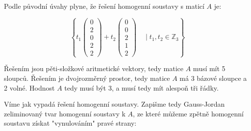 \documentclass[12pt]{article}
\begin{document}
\begin{enumerate}
    Podle původní úvahy plyne, že řešení homogenní soustavy s maticí $A$ je:

    \[
      \left\{
        t_1\left(\begin{array}{c}
          0\\2\\0\\2\\2
        \end{array}\right) +
        t_2 \left(\begin{array}{c}
          0\\0\\2\\1\\2
        \end{array}\right)
        \quad
        \mid
        t_1,t_2 \in \mathbb{Z}_3
      \right\}
    \]

    Řešením jsou pěti-složkové aritmetické vektory, tedy matice $A$ musí mít 5 sloupců.
    Řešením je dvojrozměrný prostor, tedy matice $A$ má 3 bázové sloupce a 2 volné.
    Hodnost $A$ tedy musí být 3, a musí tedy mít alespoň tři řádky.

    Víme jak vypadá řešení homogenní soustavy.
    Zapišme tedy Gauss-Jordan zeliminovaný tvar homogenní soustavy k $A$,
    ze které můžeme zpětně homogenní soustavu získat "vynulováním" pravé strany:


\end{enumerate}
\end{document}
